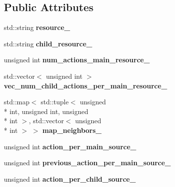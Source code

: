 \subsection*{Public Attributes}
\begin{DoxyCompactItemize}
\item 
\hypertarget{structStruct__Actions_ac929169603c419d6a0d1e6cb8dacc980}{std\-::string {\bfseries resource\-\_\-}}\label{structStruct__Actions_ac929169603c419d6a0d1e6cb8dacc980}

\item 
\hypertarget{structStruct__Actions_aa3d36d82f026212fb1f59dac88da98b2}{std\-::string {\bfseries child\-\_\-resource\-\_\-}}\label{structStruct__Actions_aa3d36d82f026212fb1f59dac88da98b2}

\item 
\hypertarget{structStruct__Actions_a5042128cbd5fb915614f1309ad1b2cf2}{unsigned int {\bfseries num\-\_\-actions\-\_\-main\-\_\-resource\-\_\-}}\label{structStruct__Actions_a5042128cbd5fb915614f1309ad1b2cf2}

\item 
\hypertarget{structStruct__Actions_a7e5104b8c833631f55201f20433680f4}{std\-::vector$<$ unsigned int $>$ {\bfseries vec\-\_\-num\-\_\-child\-\_\-actions\-\_\-per\-\_\-main\-\_\-resource\-\_\-}}\label{structStruct__Actions_a7e5104b8c833631f55201f20433680f4}

\item 
\hypertarget{structStruct__Actions_ae03ee4c360ea92bd7c381d113047c11f}{std\-::map$<$ std\-::tuple$<$ unsigned \\*
int, unsigned int, unsigned \\*
int $>$, std\-::vector$<$ unsigned \\*
int $>$ $>$ {\bfseries map\-\_\-neighbors\-\_\-}}\label{structStruct__Actions_ae03ee4c360ea92bd7c381d113047c11f}

\item 
\hypertarget{structStruct__Actions_a687f670fd743b3c4ae86daf8cf2be3b4}{unsigned int {\bfseries action\-\_\-per\-\_\-main\-\_\-source\-\_\-}}\label{structStruct__Actions_a687f670fd743b3c4ae86daf8cf2be3b4}

\item 
\hypertarget{structStruct__Actions_a500af033d64e40e926d47ca3abb69397}{unsigned int {\bfseries previous\-\_\-action\-\_\-per\-\_\-main\-\_\-source\-\_\-}}\label{structStruct__Actions_a500af033d64e40e926d47ca3abb69397}

\item 
\hypertarget{structStruct__Actions_a58e3c004e83fe50762c69d6d4bc50022}{unsigned int {\bfseries action\-\_\-per\-\_\-child\-\_\-source\-\_\-}}\label{structStruct__Actions_a58e3c004e83fe50762c69d6d4bc50022}


\end{DoxyCompactItemize}
